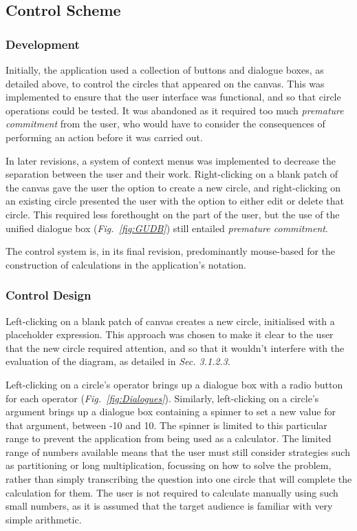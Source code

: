 \documentclass[12pt,twoside,notitlepage,xetex]{report}
\begin{document}
{\subsection{Control Scheme}


\subsubsection{Development}

Initially, the application used a collection of buttons and dialogue boxes, as detailed above, to control the circles that appeared on the canvas.  This was implemented to ensure that the user interface was functional, and so that circle operations could be tested.  It was abandoned as it required too much \emph{premature commitment} from the user, who would have to consider the consequences of performing an action before it was carried out.

In later revisions, a system of context menus was implemented to decrease the separation between the user and their work.  Right-clicking on a blank patch of the canvas gave the user the option to create a new circle, and right-clicking on an existing circle presented the user with the option to either edit or delete that circle.  This required less forethought on the part of the user, but the use of the unified dialogue box (\emph{Fig.~\ref{fig:GUDB}}) still entailed \emph{premature commitment}.

The control system is, in its final revision, predominantly mouse-based for the construction of calculations in the application's notation.

\subsubsection{Control Design}

Left-clicking on a blank patch of canvas creates a new circle, initialised with a placeholder expression.  This approach was chosen to make it clear to the user that the new circle required attention, and so that it wouldn't interfere with the evaluation of the diagram, as detailed in \emph{Sec. 3.1.2.3}.

Left-clicking on a circle's operator brings up a dialogue box with a radio button for each operator (\emph{Fig.~\ref{fig:Dialogues}}).  Similarly, left-clicking on a circle's argument brings up a dialogue box containing a spinner to set a new value for that argument, between -10 and 10.  The spinner is limited to this particular range to prevent the application from being used as a calculator.  The limited range of numbers available means that the user must still consider strategies such as partitioning or long multiplication, focussing on how to solve the problem, rather than simply transcribing the question into one circle that will complete the calculation for them.  The user is not required to calculate manually using such small numbers, as it is assumed that the target audience is familiar with very simple arithmetic.

}
\end{document}
